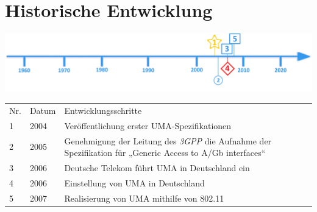 \section*{Historische Entwicklung}
\includegraphics[width=\textwidth]{Kapitel/UMA/Grafiken/Zeitstrahl}
\par
\noindent
\begin{tabular}{p{0.5 cm}p{1.5 cm}p{15.55 cm}}
\rowcolors{2}{}{\topicolor!20}
	Nr. & Datum & Entwicklungsschritte\\
	1 & 2004 & Veröffentlichung erster UMA-Spezifikationen\\
	2 & 2005 & Genehmigung der Leitung des \textit{3GPP} die Aufnahme der Spezifikation für „Generic Access to A/Gb interfaces“ \\
	3 & 2006 & Deutsche Telekom führt UMA in Deutschland ein \\
	4 & 2006 & Einstellung von UMA in Deutschland \\
	5 & 2007 & Realisierung von UMA mithilfe von 802.11\\
\end{tabular}
\par
